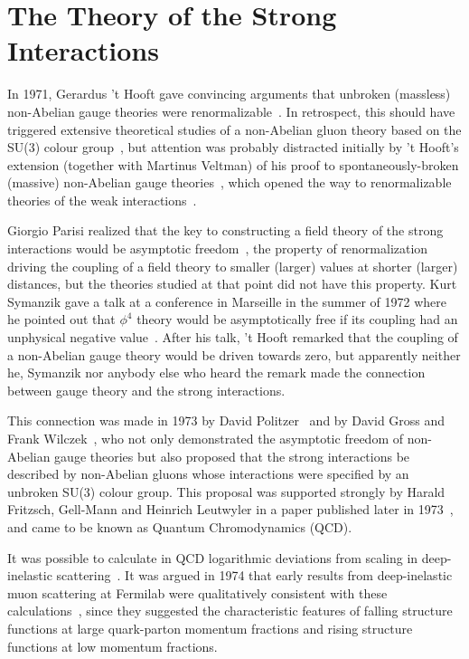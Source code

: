 \documentclass{ws-rv975x65}[12pt]
\begin{document}
\section{The Theory of the Strong Interactions}

In 1971, Gerardus 't Hooft gave convincing arguments that unbroken (massless)
non-Abelian gauge theories were renormalizable~\cite{tH}. In retrospect, this should have
triggered extensive theoretical studies of a non-Abelian gluon theory based on the
SU(3) colour group~\cite{BFM}, but attention was probably distracted initially by 't Hooft's extension
(together with Martinus Veltman) of his proof to spontaneously-broken (massive)
non-Abelian gauge theories~\cite{tHV}, which opened the way to renormalizable theories
of the weak interactions~\cite{SWEW}.

Giorgio Parisi realized that the key to constructing a field theory of the strong
interactions would be asymptotic freedom~\cite{GP}, the property of renormalization
driving the coupling of a field theory to smaller (larger) values at shorter (larger)
distances, but the theories studied at that point did not have this property.
Kurt Symanzik gave a talk at a conference in Marseille in the summer of 1972
where he pointed out that $\phi^4$ theory would be asymptotically free if
its coupling had an unphysical negative value~\cite{KS}. After his talk, 't Hooft remarked
that the coupling of a non-Abelian gauge theory would be driven towards zero,
but apparently neither he, Symanzik nor anybody else who heard the remark
made the connection between gauge theory and the strong interactions.

This connection was made in 1973 by David Politzer~\cite{DP} and by David Gross and
Frank Wilczek~\cite{GW}, who not only demonstrated the asymptotic freedom of
non-Abelian gauge theories but also proposed that the strong interactions be
described by non-Abelian gluons whose interactions were specified by an
unbroken SU(3) colour group. This proposal was supported strongly by
Harald Fritzsch, Gell-Mann and Heinrich Leutwyler in a paper published
later in 1973~\cite{FGL}, and came to be known as Quantum Chromodynamics (QCD).

It was possible to calculate in QCD logarithmic deviations from scaling in
deep-inelastic scattering~\cite{GPGW}. It was argued in 1974 that early results from
deep-inelastic muon scattering at Fermilab were qualitatively consistent
with these calculations~\cite{London}, since they suggested the characteristic  features
of falling structure functions at large quark-parton momentum fractions
and rising structure functions at low momentum fractions.
\end{document}
